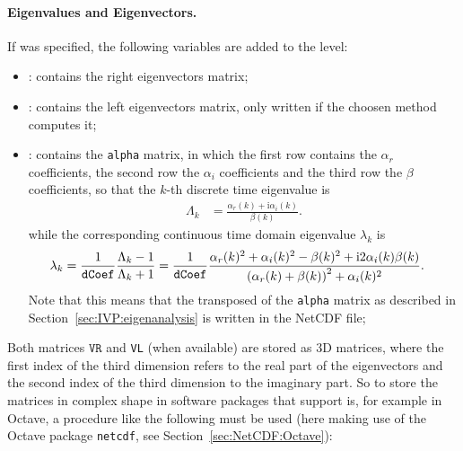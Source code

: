 \paragraph{Eigenvalues and Eigenvectors.}
If  was specified, the following variables are added to the
 level:
\begin{itemize}
\item {} : contains the right eigenvectors matrix;
\item {} : contains the left eigenvectors matrix, only
  written if the choosen method computes it;
\item {} : contains the \texttt{alpha} matrix, in which
  the first row contains the $\alpha_r$ coefficients, the second row the $\alpha_i$
  coefficients and the third row the $\beta$ coefficients, so that the $k$-th
  discrete time eigenvalue is
    \begin{align}
	\Lambda_k
	&=
	\frac{\alpha_r(k) + \text{i} \alpha_i(k)}{\beta(k)}
	.
    \end{align}
    while the corresponding continuous time domain eigenvalue $\lambda_k$ is
    \begin{align}
        \lambda_k
	&=
	\frac{1}{\texttt{dCoef}}
	\frac{\Lambda_k - 1}{\Lambda_k + 1}
	=
	\frac{1}{\texttt{dCoef}}
	\frac{
		\alpha_r(k)^2
		+
		\alpha_i(k)^2
		-
		\beta(k)^2
		+
		\text{i} 2 \alpha_i(k) \beta(k)
	}{
		\left( \alpha_r(k) + \beta(k) \right)^2 + \alpha_i(k)^2
	}
	.
    \end{align}
    Note that this means that the transposed of the \texttt{alpha} matrix as
    described in Section~\ref{sec:IVP:eigenanalysis} is written in the NetCDF file;
\end{itemize}
Both matrices $\texttt{VR}$ and \texttt{VL} (when available) are stored as 3D
matrices, where the first index of the third dimension refers to the real part of the
eigenvectors and the second index of the third dimension to the imaginary part. So to
store the matrices in complex shape in software packages that support is, for example
in Octave, a procedure like the following must be used (here making use of the Octave
package \texttt{netcdf}, see 
Section~\ref{sec:NetCDF:Octave}):

